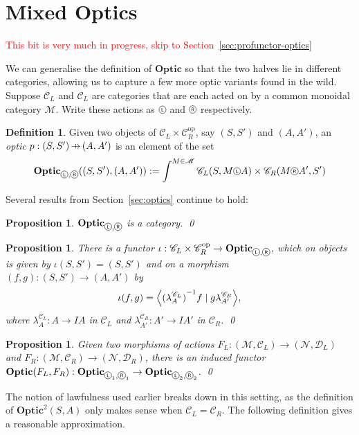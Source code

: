 \documentclass[11pt,letterpaper]{article}
\theoremstyle{plain}
\newtheorem{proposition}[theorem]{Proposition}
\theoremstyle{definition}
\newtheorem{definition}[theorem]{Definition}
\newcommand{\C}{\mathscr{C}}
\newcommand{\D}{\mathscr{D}}
\newcommand{\M}{\mathscr{M}}
\newcommand{\N}{\mathscr{N}}
\newcommand{\Optic}{\mathbf{Optic}}
\newcommand{\Twoptic}{\mathbf{Optic}^2}
\newcommand{\op}{\mathrm{op}}
\newcommand*\circled[1]{\tikz[baseline={([yshift=-0.65ex]current bounding box.center)}]{
   \node[shape=circle,draw,inner sep=1pt] (char) {#1};}}
\newcommand{\actL}{{\circled{\tiny$\mathsf{L}$}}}
\newcommand{\actR}{{\circled{\tiny$\mathsf{R}$}}}
\newcommand{\rep}[2]{{\ensuremath \left\langle #1 \mid #2 \right\rangle}}
\newcommand{\hto}{\ensuremath{\,\mathaccent\shortmid\rightarrow\,}}
\newcommand{\todo}[1]{\textcolor{red}{\small #1}}
\begin{document}
\section{Mixed Optics}\label{sec:mixed-optics}

\todo{This bit is very much in progress, skip to Section~\ref{sec:profunctor-optics}}

We can generalise the definition of $\Optic$ so that the two halves lie in different categories, allowing us to capture a few more optic variants found in the wild. Suppose $\C_L$ and $\C_L$ are categories that are each acted on by a common monoidal category $\M$. Write these actions as $\actL$ and $\actR$ respectively.

\begin{definition}
  Given two objects of $\C_L \times \C_R^\op$, say $(S, S')$ and $(A, A')$, an \emph{optic} $p : (S, S') \hto (A, A')$ is an element of the set
  \begin{align*}
    \Optic_{\actL, \actR}((S, S'), (A, A')) := \int^{M \in \M} \C_L(S, M \actL A) \times \C_R(M \actR A', S')
  \end{align*}
\end{definition}

Several results from Section~\ref{sec:optics} continue to hold:
\begin{proposition}\label{prop:mixed-optic-is-cat}
  $\Optic_{\actL, \actR}$ is a category. \qed
\end{proposition}
\begin{proposition}
  There is a functor $\iota : \C_L \times \C_R^\op \to \Optic_{\actL, \actR}$, which on objects is given by $\iota(S, S') = (S, S')$ and on a morphism $(f, g) : (S, S') \to (A, A')$ by \[\iota(f, g) = \rep{{(\lambda^{\C_L}_A)}^{-1} f}{g \lambda^{\C_R}_{A'}},\] where $\lambda^{\C_L}_A : A \to IA$ in $\C_L$ and $\lambda^{\C_R}_{A'} : A' \to IA'$ in $\C_R$. \qed
\end{proposition}
\begin{proposition}\label{prop:mixed-change-of-action}
  Given two morphisms of actions $F_L : (\M, \C_L) \to (\N, \D_L)$ and $F_R : (\M, \C_R) \to (\N, \D_R)$, there is an induced functor $\Optic(F_L, F_R) : \Optic_{\actL_1, \actR_1} \to \Optic_{\actL_2, \actR_2}$. \qed
\end{proposition}

The notion of lawfulness used earlier breaks down in this setting, as the definition of $\Twoptic(S, A)$ only makes sense when $\C_L = \C_R$. The following definition gives a reasonable approximation.
\end{document}
